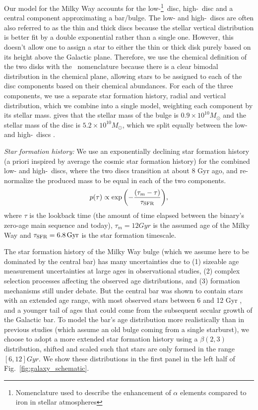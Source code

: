 Our model for the Milky Way accounts for the low-\achem\footnote{Nomenclature used to describe the enhancement of $\alpha$ elements compared to iron in stellar atmospheres}~disc, high-\achem~disc and a central component approximating a bar/bulge. The low- and high-\achem~discs are often also referred to as the thin and thick discs because the stellar vertical distribution is better fit by a double exponential rather than a single one. However, this doesn't allow one to assign a star to either the thin or thick disk purely based on its height above the Galactic plane. Therefore, we use the chemical definition of the two disks with the \achem~nomenclature because there is a clear bimodal distribution in the chemical plane, allowing stars to be assigned to each of the disc components based on their chemical abundances. For each of the three components, we use a separate star formation history, radial and vertical distribution, which we combine into a single model, weighting each component by its stellar mass. \citet{Licquia+2015} gives that the stellar mass of the bulge is $0.9 \times 10^{10} \unit{M_{\odot}}$ and the stellar mass of the disc is $5.2 \times 10^{10} \unit{M_\odot}$, which we split equally between the low- and high-\achem~discs \citep[e.g.,][]{Snaith+2014}.

\textit{Star formation history:} 
We use an exponentially declining star formation history \citep{Frankel+2018} (a priori inspired by average the cosmic star formation history) for the combined low- and high-\achem~discs, where the two discs transition at about 8 Gyr ago, and re-normalize the produced mass to be equal in each of the two components.
\begin{equation}\label{eq:thin_disc_tau}
    p(\tau) \propto \exp \qty(-\frac{(\tau_m - \tau)}{\tau_{\rm SFR}}),
\end{equation}
where $\tau$ is the lookback time (the amount of time elapsed between the binary's zero-age main sequence and today), $\tau_m = 12 \unit{Gyr}$ is the assumed age of the Milky Way and $\tau_{\rm SFR} = 6.8 \unit{Gyr}$ is the star formation timescale. 

The star formation history of the Milky Way bulge (which we assume here to be dominated by the central bar) has many uncertainties due to (1) sizeable age measurement uncertainties at large ages in observational studies, (2) complex selection processes affecting the observed age distributions, and (3) formation mechanisms still under debate. But the central bar was shown to contain stars with an extended age range, with most observed stars between 6 and 12 Gyr \citep[e.g.,][]{Bovy+2019}, and a younger tail of ages that could come from the subsequent secular growth of the Galactic bar. To model the bar's age distribution more realistically than in previous studies (which assume an old bulge coming from a single starburst), we choose to adopt a more extended star formation history using a $\beta(2,3)$ distribution, shifted and scaled such that stars are only formed in the range $[6, 12] \unit{Gyr}$. We show these distributions in the first panel in the left half of Fig.~\ref{fig:galaxy_schematic}.

